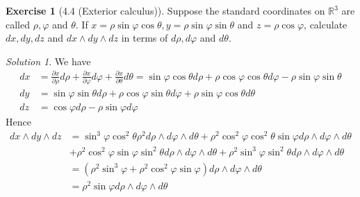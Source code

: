 \documentclass[reqno]{amsart}
\theoremstyle{plain}%
\theoremstyle{definition}
\newtheorem{exercise}[theorem]{Exercise}
\theoremstyle{remark}
\newtheorem*{solution}{Solution}
\begin{document}
\begin{exercise}[4.4 (Exterior calculus)]
    Suppose the standard coordinates on $\mathbb{R}^3$ are called
    $\rho , \varphi$ and $\theta$. If $x = \rho \sin
    \varphi \cos \theta, y = \rho  \sin \varphi \sin \theta$ and
    $z = \rho  \cos \varphi$, calculate $dx, dy, dz$ and
    $dx \wedge dy \wedge dz$ in terms of $d \rho ,
    d \varphi$ and $d \theta$.
\end{exercise}

\begin{solution}
    We have
    \begin{align*}
        dx &= \frac{\partial x}{\partial \rho }  d \rho  +
    \frac{\partial x}{\partial \varphi}  d \varphi + 
    \frac{\partial x}{\partial \theta} d \theta
    = \sin \varphi \cos \theta d \rho  + 
    \rho  \cos \varphi \cos \theta d \varphi -
    \rho  \sin \varphi \sin \theta\\
    dy
    &= \sin \varphi \sin \theta d \rho  + 
    \rho  \cos \varphi \sin \theta d \varphi + 
    \rho \sin \varphi \cos \theta d \theta\\
    dz 
    &= \cos \varphi d \rho - \rho  \sin \varphi d \varphi
    \end{align*}
    Hence
    \begin{align*}
        dx \wedge dy \wedge dz
        &=  \sin^3 \varphi \cos^2 \theta \rho^2 d \rho \wedge
        d \varphi \wedge d \theta +
        \rho^2  \cos^2 \varphi \cos^2 \theta \sin \varphi
        d \rho  \wedge d \varphi \wedge d \theta\\
        &+ \rho^2 \cos^2 \varphi \sin \varphi \sin^2 \theta 
        d \rho  \wedge d \varphi \wedge d \theta +
        \rho^2  \sin^3 \varphi \sin^2 \theta 
        d \rho  \wedge d \varphi \wedge d \theta\\
        &= \left(  \rho ^2 \sin^3 \varphi + 
        \rho^2 \cos^2 \varphi \sin \varphi \right) d \rho \wedge
        d \varphi \wedge d \theta\\
        &= \rho^2 \sin \varphi d \rho  \wedge d \varphi \wedge
        d \theta
    \end{align*}
\end{solution}
\end{document}
